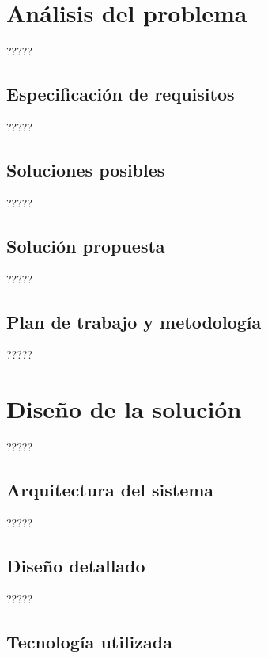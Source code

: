 \documentclass[11pt,spanish,listoffigures]{tfgetsinf}
\begin{document}

\chapter{Análisis del problema}

?????

\section{Especificación de requisitos}

?????

\section{Soluciones posibles}

?????

\section{Solución propuesta}

?????

\section{Plan de trabajo y metodología}

?????


\chapter{Diseño de la solución}

?????

\section{Arquitectura del sistema}

?????

\section{Diseño detallado}

?????

\section{Tecnología utilizada}
\end{document}
